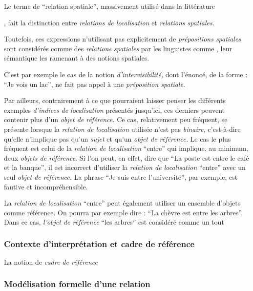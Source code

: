 Le terme de \enquote{relation spatiale}, massivement utilisé dans la
littérature 

\textcite{Duchene2019}, fait la distinction entre \emph{relations de
  localisation} et \emph{relations spatiales.}

Toutefois, ces expressions n'utilisant pas explicitement de
\emph{prépositions spatiales} sont considérés comme des
\emph{relations spatiales} par les linguistes comme
\textcite{Vandeloise1986}, leur sémantique les ramenant à des notions
spatiales.

C'est par exemple le cas de la notion \emph{d'intervisibilité,} dont
l'énoncé, de la forme : \enquote{Je vois un lac}, ne fait pas appel à
une \emph{préposition spatiale.}

Par ailleurs, contrairement à ce que pourraient laisser penser les
différents exemples \emph{d'indices de localisation} présentés
jusqu'ici, ces derniers peuvent contenir plus d'un \emph{objet de
  référence.} Ce cas, relativement peu fréquent, se présente lorsque
la \emph{relation de localisation} utilisée n'est pas \emph{binaire,}
c'est-à-dire qu'elle n'implique pas qu'un \emph{sujet} et qu'un
\emph{objet de référence.} Le cas le plus fréquent est celui de la
\emph{relation de localisation} \enquote{entre} qui implique, au
minimum, deux \emph{objets de référence}. Si l'on peut, en effet, dire
que \enquote{La poste est entre le café et la banque}, il est
incorrect d'utiliser la \emph{relation de localisation}
\enquote{entre} avec un seul \emph{objet de référence.} La phrase
\enquote{Je suis entre l'université}, par exemple, est fautive et
incompréhensible.

La \emph{relation de localisation} \enquote{entre} peut également
utiliser un ensemble d'objets comme référence. On pourra par exemple
dire : \enquote{La chèvre est entre les arbres}. Dans ce cas, \emph{l'objet
de référence} \enquote{les arbres} est considéré comme un tout

\subsubsection{Contexte d'interprétation et cadre de référence}

La notion de \emph{cadre de référence}

\subsubsection{Modélisation formelle d'une relation}

